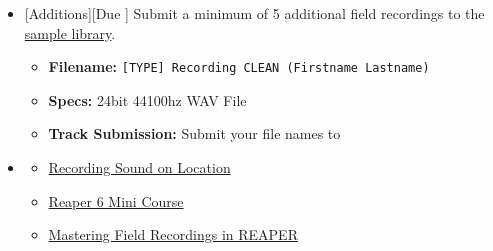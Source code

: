 \begin{itemize}[noitemsep,topsep=0pt,leftmargin=*]
\begin{itemize}
	      \end{itemize}
	\item {}[Additions][Due \dSun] \newline
	      Submit a minimum of 5 additional field recordings to the \href{\samplelibPermURL}{sample library}.
	      \begin{itemize}
		      \item \textbf{Filename:} \texttt{[TYPE] Recording CLEAN (Firstname Lastname)}
		      \item \textbf{Specs:} 24bit 44100hz WAV File
		      \item \textbf{Track Submission:} Submit your file names to \discordS
	      \end{itemize}
	\item {}
	      \begin{resenv}
		      \begin{itemize}
			      \item \href{https://www.youtube.com/watch?v=TKBzjSSaKXU}{Recording Sound on Location}
			      \item \href{https://www.youtube.com/playlist?list=PLM0xHqxaiT6-plorG47t3balft4nVki39}{Reaper 6 Mini Course}
			      \item \href{https://www.youtube.com/watch?v=7BfWqRapF5E}{Mastering Field Recordings in REAPER}
		      \end{itemize}
	      \end{resenv}
\end{itemize}